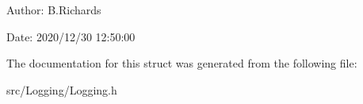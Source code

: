 \begin{DoxyParagraph}{Author\-:}
B.\-Richards 
\end{DoxyParagraph}
\begin{DoxyParagraph}{Date\-:}
2020/12/30 12\-:50\-:00 
\end{DoxyParagraph}


The documentation for this struct was generated from the following file\-:\begin{DoxyCompactItemize}
\item 
src/\-Logging/Logging.\-h\end{DoxyCompactItemize}
